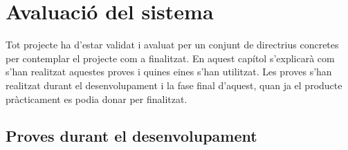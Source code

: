 
\chapter{Avaluació del sistema} %

\label{Chapter8} %

Tot projecte ha d'estar validat i avaluat per un conjunt de directrius concretes per contemplar el projecte com a finalitzat. En aquest capítol s'explicarà com s'han realitzat aquestes proves i quines eines s'han utilitzat. Les proves s'han realitzat durant el desenvolupament i la fase final d'aquest, quan ja el producte pràcticament es podia donar per finalitzat.


\section{Proves durant el desenvolupament}

